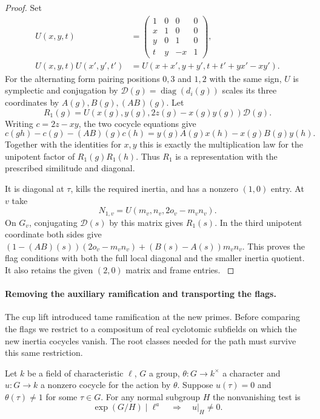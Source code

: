 \begin{proof}
Set
\[
\begin{aligned}
 U(x,y,t)&=
 \begin{pmatrix}
 1&0&0&0\\ x&1&0&0\\ y&0&1&0\\ t&y&-x&1
 \end{pmatrix},\\
 U(x,y,t)U(x',y',t')&=U(x+x',y+y',t+t'+yx'-xy') .
\end{aligned}
\]
For the alternating form pairing positions \(0,3\) and \(1,2\)
with the same sign, \(U\) is symplectic and conjugation by
\(\mathcal D(g)=\operatorname{diag}(d_i(g))\) scales its three
coordinates by \(A(g),B(g),(AB)(g)\).
Let
\[
 R_1(g)=U(x(g),y(g),2z(g)-x(g)y(g))\mathcal D(g).
\]
Writing \(c=2z-xy\), the two cocycle equations give
\[
 c(gh)-c(g)-(AB)(g)c(h)
   =y(g)A(g)x(h)-x(g)B(g)y(h).
\]
Together with the identities for \(x,y\) this is exactly the
multiplication law for the unipotent factor of
\(R_1(g)R_1(h)\). Thus \(R_1\) is a representation with
the prescribed similitude and diagonal.

It is diagonal at \(\tau\), kills the required inertia, and has a
nonzero \((1,0)\) entry. At \(v\) take
\[
                         N_{1,v}=U(m_v,n_v,2o_v-m_vn_v).
\]
On \(G_v\), conjugating \(\mathcal D(s)\) by this matrix gives
\(R_1(s)\). In the third unipotent coordinate both sides give
\((1-(AB)(s))(2o_v-m_vn_v)+(B(s)-A(s))m_vn_v\).
This proves the flag conditions with both the full local
diagonal and the smaller inertia quotient. It also retains
the given \((2,0)\) matrix and frame entries.
\label{cor:cohomology-count-two-chain-2}
\end{proof}

\paragraph{Removing the auxiliary ramification and transporting the flags.}
\label{par:count-two-restriction}
The cup lift introduced tame ramification at the new primes. Before comparing the flags we restrict to a compositum of real cyclotomic subfields on which the new inertia cocycles vanish. The root classes needed for the path must survive this same restriction.

\begin{auxlemma}
\label{lem:root-cocycle-ell-power}
Let \(k\) be a field of characteristic \(\ell\), \(G\) a group,
\(\theta:G\to k^\times\) a character and \(u:G\to k\) a nonzero
cocycle for the action by \(\theta\). Suppose \(u(\tau)=0\) and
\(\theta(\tau)\ne1\) for some \(\tau\in G\). For any normal subgroup \(H\) the nonvanishing test is 
\[
 \exp(G/H)\mid\ell^a\quad\Longrightarrow\quad u|_H\ne0.
\]

\end{auxlemma}


